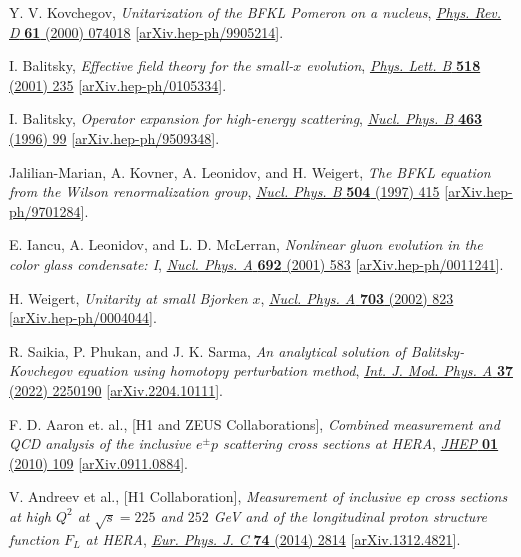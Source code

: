 \documentclass[12pt]{article}
\begin{document}
\begin{thebibliography}{99}
Y. V. Kovchegov, \emph{Unitarization of the BFKL Pomeron on a nucleus}, \href{https://doi.org/10.1103/PhysRevD.61.074018}{\emph{Phys. Rev. D} {\bf 61} (2000) 074018} [\href{https://doi.org/10.48550/arXiv.hep-ph/9905214}{arXiv.hep-ph/9905214}].

I. Balitsky, \emph{Effective field theory for the small-$x$ evolution}, \href{https://doi.org/10.1016/S0370-2693(01)01041-3}{\emph{Phys. Lett. B} {\bf 518} (2001) 235} [\href{https://doi.org/10.48550/arXiv.hep-ph/0105334}{arXiv.hep-ph/0105334}].

I. Balitsky, \emph{Operator expansion for high-energy scattering}, \href{https://doi.org/10.1016/0550-3213(95)00638-9}{\emph{Nucl. Phys. B} {\bf 463} (1996) 99} [\href{https://doi.org/10.48550/arXiv.hep-ph/9509348}{arXiv.hep-ph/9509348}].

Jalilian-Marian, A. Kovner, A. Leonidov, and H. Weigert, \emph{The BFKL equation from the Wilson renormalization group}, \href{https://doi.org/10.1016/S0550-3213(97)00440-9}{\emph{Nucl. Phys. B} {\bf 504} (1997) 415} [\href{https://doi.org/10.48550/arXiv.hep-ph/9701284}{arXiv.hep-ph/9701284}].

E. Iancu, A. Leonidov, and L. D. McLerran, \emph{Nonlinear gluon evolution in the color glass condensate: I}, \href{https://doi.org/10.1016/S0375-9474(01)00642-X}{\emph{Nucl. Phys. A} {\bf 692} (2001) 583} [\href{https://doi.org/10.48550/arXiv.hep-ph/0011241}{arXiv.hep-ph/0011241}].

H. Weigert, \emph{Unitarity at small Bjorken $x$}, \href{https://doi.org/10.1016/S0375-9474(01)01668-2}{\emph{Nucl. Phys. A} {\bf 703} (2002) 823} [\href{https://doi.org/10.48550/arXiv.hep-ph/0004044}{arXiv.hep-ph/0004044}].

R. Saikia, P. Phukan, and J. K. Sarma, \emph{An analytical solution of Balitsky-Kovchegov equation using homotopy perturbation method}, \href{https://doi.org/10.1142/S0217751X22501901}{\emph{Int. J. Mod. Phys. A} {\bf 37} (2022) 2250190} [\href{https://doi.org/10.48550/arXiv.2204.10111}{arXiv.2204.10111}].

F. D. Aaron et. al., [H1 and ZEUS Collaborations], \emph{Combined measurement and QCD analysis of the
	inclusive $e^{\pm}p$ scattering cross sections at HERA}, \href{https://doi.org/10.1007/JHEP01(2010)109}{\emph{JHEP} {\bf 01} (2010) 109} [\href{https://doi.org/10.48550/arXiv.0911.0884}{arXiv.0911.0884}].

V. Andreev et al., [H1 Collaboration], \emph{Measurement of inclusive ep cross sections at high $Q^2$ at $\sqrt{s} = 225$ and $252$ GeV and of the longitudinal proton structure function $F_L$ at HERA}, \href{https://doi.org/10.1140/epjc/s10052-014-2814-6}{\emph{Eur. Phys. J. C} {\bf 74} (2014) 2814} [\href{https://doi.org/10.48550/arXiv.1312.4821}{arXiv.1312.4821}]. 


\end{thebibliography}
\end{document}
